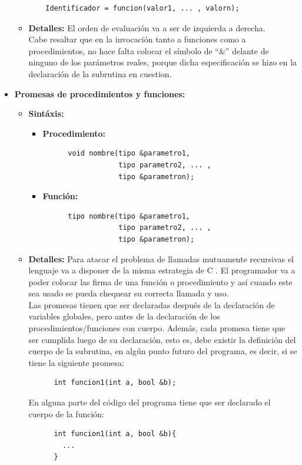 \documentclass[11pt, spanish]{report}
\begin{document}
\begin{itemize}
\begin{itemize}
\begin{verbatim}
    Identificador = funcion(valor1, ... , valorn); \end{verbatim}
  \item \textbf{Detalles:}
    El orden de evaluaci\'on va a ser de izquierda a derecha.\\ 

    Cabe resaltar que en la invocaci\'on tanto a funciones como a procedimientos, no hace falta colocar el s\'imbolo de ``\&'' delante de ninguno de los 
    par\'ametros reales, porque dicha especificaci\'on se hizo en la declaraci\'on de la subrutina en cuestion.\\
  \end{itemize}

\item \textbf{Promesas de procedimientos y funciones:} 
  \begin{itemize}
  \item \textbf{Sint\'axis:} 
    \begin{itemize}
    \item \textbf{Procedimiento:} \begin{verbatim}
      void nombre(tipo &parametro1,
                  tipo parametro2, ... ,
                  tipo &parametron);
      \end{verbatim}
    \item \textbf{Funci\'on:} \begin{verbatim}
      tipo nombre(tipo &parametro1,
                  tipo parametro2, ... ,
                  tipo &parametron);
      \end{verbatim}
    \end{itemize}
  \item \textbf{Detalles:}
    Para atacar el problema de llamadas mutuamente recursivas el lenguaje va a disponer de la misma estrategia de C . El programador va a poder colocar las firma de una 
    funci\'on o procedimiento y as\'i cuando este sea usado se pueda chequear su correcta llamada y uso.\\
    
    Las promesas tienen que ser declaradas despu\'es de la declaraci\'on de variables globales, pero antes de la declaraci\'on de los procedimientos/funciones con cuerpo. 
    Adem\'as, cada promesa tiene que ser cumplida luego de su declaraci\'on, esto es, debe existir la definici\'on del cuerpo de la subrutina, en alg\'un punto futuro 
    del programa, es decir, si se tiene la siguiente promesa:

    \begin{verbatim}
      int funcion1(int a, bool &b);
    \end{verbatim}

    En alguna parte del c\'odigo del programa tiene que ser declarado el cuerpo de la funci\'on:

    \begin{verbatim}
      int funcion1(int a, bool &b){
        ...
      }
    \end{verbatim}
  \end{itemize}
\end{itemize}
\end{document}
